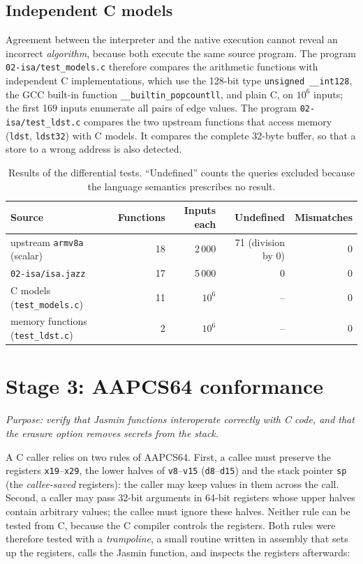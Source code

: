 \documentclass[11pt,a4paper]{article}
\newcommand{\file}[1]{\texttt{#1}}
\begin{document}
\subsection{Independent C models}

Agreement between the interpreter and the native execution cannot reveal an
incorrect \emph{algorithm}, because both execute the same source program.
The program \file{02-isa/test\_models.c} therefore compares the arithmetic
functions with independent C implementations, which use the 128-bit type
\texttt{unsigned \_\_int128}, the GCC built-in function
\texttt{\_\_builtin\_popcountll}, and plain C, on $10^6$ inputs; the first
169 inputs enumerate all pairs of edge values. The program
\file{02-isa/test\_ldst.c} compares the two upstream functions that access
memory (\texttt{ldst}, \texttt{ldst32}) with C models. It compares the
complete 32-byte buffer, so that a store to a wrong address is also
detected.

\begin{table}[h]
\centering\small
\begin{tabular}{@{}lrrrr@{}}
\toprule
\textbf{Source} & \textbf{Functions} & \textbf{Inputs each} & \textbf{Undefined} & \textbf{Mismatches} \\
\midrule
upstream \file{armv8a} (scalar) & 18 & 2\,000 & 71 (division by 0) & 0 \\
\file{02-isa/isa.jazz} & 17 & 5\,000 & 0 & 0 \\
C models (\file{test\_models.c}) & 11 & $10^6$ & -- & 0 \\
memory functions (\file{test\_ldst.c}) & 2 & $10^6$ & -- & 0 \\
\bottomrule
\end{tabular}
\caption{Results of the differential tests. ``Undefined'' counts the queries
excluded because the language semantics prescribes no result.}
\end{table}

\section{Stage 3: AAPCS64 conformance}

\emph{Purpose: verify that Jasmin functions interoperate correctly with C
code, and that the erasure option removes secrets from the stack.}

A C caller relies on two rules of AAPCS64. First, a callee must preserve the
registers \texttt{x19}--\texttt{x29}, the lower halves of
\texttt{v8}--\texttt{v15} (\texttt{d8}--\texttt{d15}) and the stack pointer
\texttt{sp} (the \emph{callee-saved} registers): the caller may keep values
in them across the call. Second, a caller may pass 32-bit arguments in
64-bit registers whose upper halves contain arbitrary values; the callee
must ignore these halves. Neither rule can be tested from C, because the C
compiler controls the registers. Both rules were therefore tested with a
\emph{trampoline}, a small routine written in assembly that sets up the
registers, calls the Jasmin function, and inspects the registers afterwards:
\end{document}
